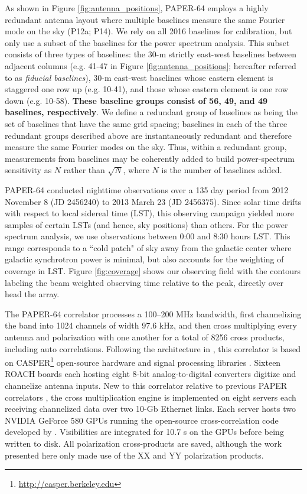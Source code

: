 \documentclass[twocolumn,numberedappendix]{emulateapj} \shorttitle{New Limits on the 21 cm Power Spectrum at $z=8.4$}
\begin{document}
As shown in Figure \ref{fig:antenna_positions}, PAPER-64 employs
a highly redundant antenna layout where multiple baselines measure
the same Fourier mode on the sky (P12a; P14).
We rely on all 2016 baselines for calibration,
but only use a subset of the baselines for the power spectrum
analysis. This subset consists of three types of baselines: the 30-m
strictly east-west baselines between adjacent columns (e.g. 41-47
in Figure \ref{fig:antenna_positions}; hereafter referred to 
as {\it fiducial baselines}), 30-m east-west baselines
whose eastern element is staggered one row up (e.g. 10-41), and
those whose eastern element is one row down (e.g. 10-58). \textbf{These baseline
groups consist of 56, 49, and 49 baselines, respectively}.
We define a redundant group of
baselines as being the set of baselines that have the same grid spacing;
baselines in each
of the three redundant groups described above are instantaneously redundant and
therefore measure the same Fourier modes on the sky. Thus, within a redundant group,
measurements from baselines may be 
coherently added to build power-spectrum sensitivity as $N$ rather than
$\sqrt{N}$, where $N$ is the number of baselines added.  

PAPER-64 conducted nighttime observations over a 135 day period 
from 2012 November 8 (JD 2456240) to 2013 March 23 (JD 2456375). 
Since solar time drifts with respect to local sidereal time (LST), this observing campaign
yielded more samples of certain LSTs (and hence, sky positions) than others. 
For the power spectrum analysis, we use observations between 0:00 and 8:30 hours
LST.  This range corresponds to
a ``cold patch" of sky away from the galactic center where galactic synchrotron power is minimal,
but also accounts for the weighting of coverage in LST.
Figure \ref{fig:coverage} shows our observing field with the contours labeling
the beam weighted observing time relative to the peak, directly over head the
array.

The PAPER-64 correlator processes a 100--200 MHz bandwidth, first
channelizing the band into 1024 channels of width 97.6 kHz, and then
cross multiplying every antenna and polarization with one another for a total of
8256 cross products, including auto correlations.  Following the architecture 
in \citet{parsons_et_al2008}, this
correlator is based on CASPER\footnote{\url{http://casper.berkeley.edu}} open-source
hardware and signal processing libraries \citep{parsons_et_al2006}.  
Sixteen ROACH boards each hosting eight 8-bit analog-to-digital
converters digitize and channelize antenna inputs. New to this correlator relative to previous PAPER correlators \citep{parsons_et_al2010},
the cross multiplication engine is implemented on eight servers each receiving
channelized data over two 10-Gb Ethernet links.  Each server hosts
two NVIDIA GeForce 580 GPUs running the open-source cross-correlation code developed
by \citet{clark_et_al2013}.
Visibilities are integrated for 10.7 s on the GPUs before
being written to disk.  All polarization cross-products are saved, although the
work presented here only made use of the XX and YY polarization products.
\end{document}
